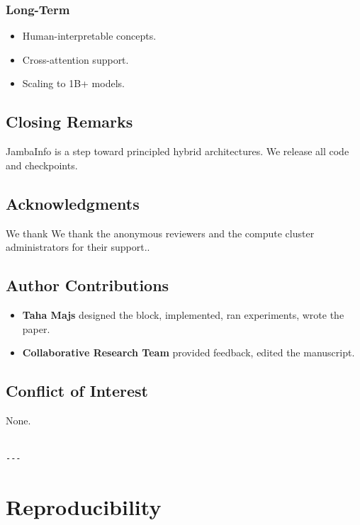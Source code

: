 \subsubsection{Long-Term}
\begin{itemize}
\item Human-interpretable concepts.
\item Cross-attention support.
\item Scaling to 1B+ models.

\end{itemize}
\subsection{Closing Remarks}

JambaInfo is a step toward principled hybrid architectures. We release 
all code and checkpoints.

\subsection{Acknowledgments}

We thank We thank the anonymous reviewers and the compute cluster administrators for their support..

\subsection{Author Contributions}

\begin{itemize}
\item \textbf{Taha Majs} designed the block, implemented, ran experiments, wrote
  the paper.
\item \textbf{Collaborative Research Team} provided feedback, edited the manuscript.

\end{itemize}
\subsection{Conflict of Interest}

None.
\begin{lstlisting}

---
\end{lstlisting}

\section{Reproducibility}

